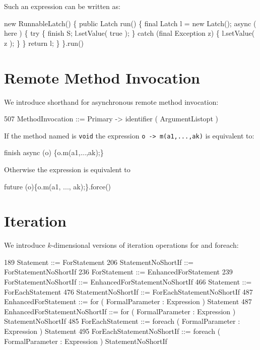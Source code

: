 {{Such an expression can be written as:
\begin{x10}
  new RunnableLatch() \{
      public Latch run() \{
         final Latch l = new Latch();
         async ( here ) \{
            try \{
                finish S;
                l.setValue( true );
            \} catch (final Exception z) \{
                 l.setValue( z );
            \}
         \}
         return l;
      \}
    \}.run()
\end{x10}

\section{Remote Method Invocation}
We introduce shorthand for asynchronous remote method invocation:

\begin{x10}
507   MethodInvocation ::= Primary -> identifier ( ArgumentListopt )
\end{x10}

If the method named is {\tt void} the expression {\tt o -> m(a1,...,ak)}
is equivalent to:
\begin{x10}
 finish async (o) \{o.m(a1,...,ak);\}
\end{x10}

Otherwise the expression is equivalent to
\begin{x10}
 future (o)\{o.m(a1, ..., ak);\}.force()
\end{x10}


\section{Iteration}\label{ForLoop}
\label{ForAllLoop}

We introduce  $k$-dimensional versions of iteration operations {\cf for} and 
{\cf foreach}:

\begin{x10}
189 Statement ::= ForStatement
206 StatementNoShortIf ::= ForStatementNoShortIf
236 ForStatement ::= EnhancedForStatement
239 ForStatementNoShortIf ::= EnhancedForStatementNoShortIf
466 Statement ::= ForEachStatement
476 StatementNoShortIf ::= ForEachStatementNoShortIf
487 EnhancedForStatement ::= 
       for ( FormalParameter : Expression ) Statement
487 EnhancedForStatementNoShortIf ::= 
       for ( FormalParameter : Expression ) 
           StatementNoShortIf
485  ForEachStatement ::= 
       foreach ( FormalParameter : Expression ) 
           Statement
495  ForEachStatementNoShortIf ::= 
        foreach ( FormalParameter : Expression ) 
          StatementNoShortIf
\end{x10}

}}
